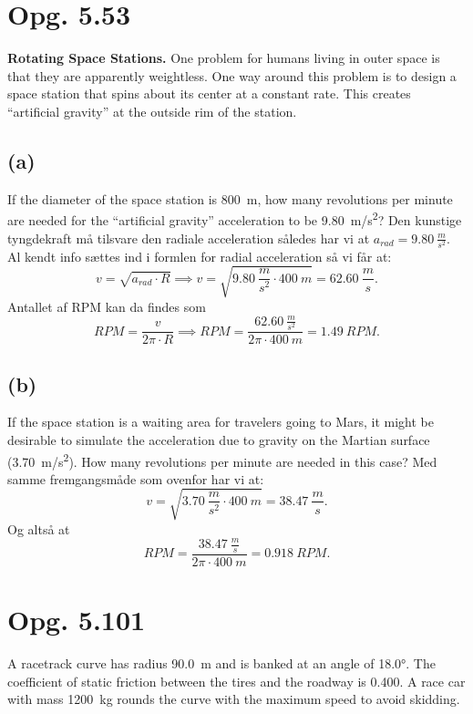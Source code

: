 \documentclass[12pt]{article}
\begin{document}
\section*{Opg. 5.53}
\textbf{Rotating Space Stations.}
One problem for humans living in outer space is that they are apparently weightless.
One way around this problem is to design a space station that spins about its center at a constant rate. 
This creates “artificial gravity” at the outside rim of the station.


\subsection*{(a)}
If the diameter of the space station is \qty{800}{m}, how many revolutions per minute are needed for the “artificial gravity” acceleration to be \qty{9.80}{m/s^2}?  
\bigbreak
Den kunstige tyngdekraft må tilsvare den radiale acceleration således har vi at $a_{rad} = \qty{9,80}{\frac{m}{s^2}}$. Al kendt info sættes ind i formlen for radial acceleration så vi får at:
\[
v = \sqrt{a_{rad}\cdot R} \implies v = \sqrt{\qty{9,80}{\frac{m}{s^2}}\cdot \qty{400}{m}} = \qty{62,60}{\frac{m}{s}}
.\] 
Antallet af RPM kan da findes som
\[
  \unit{RPM} = \frac{v}{2\pi\cdot R} \implies \unit{RPM} = \frac{\qty{62,60}{\frac{m}{s^2}}}{2\pi\cdot \qty{400}{m}} = \qty{1,49}{RPM}
.\] 


\subsection*{(b)}
If the space station is a waiting area for travelers going to Mars, it might be desirable to simulate the acceleration due to gravity on the Martian surface (\qty{3.70}{m/s^2}). 
How many revolutions per minute are needed in this case?
\bigbreak
Med samme fremgangsmåde som ovenfor har vi at:
\[
v = \sqrt{\qty{3,70}{\frac{m}{s^2}}\cdot \qty{400}{m}}  = \qty{38,47}{\frac{m}{s}}
.\] 
Og altså at
\[
  \unit{RPM} = \frac{\qty{38,47}{\frac{m}{s}}}{2\pi\cdot \qty{400}{m}} = \qty{0,918}{RPM}
.\] 

\section*{Opg. 5.101}
A racetrack curve has radius \qty{90.0}{m} and is banked at an angle of \ang{18.0}.
The coefficient of static friction between the tires and the roadway is \num{0.400}.
A race car with mass \qty{1200}{kg} rounds the curve with the maximum speed to avoid skidding.
\end{document}
